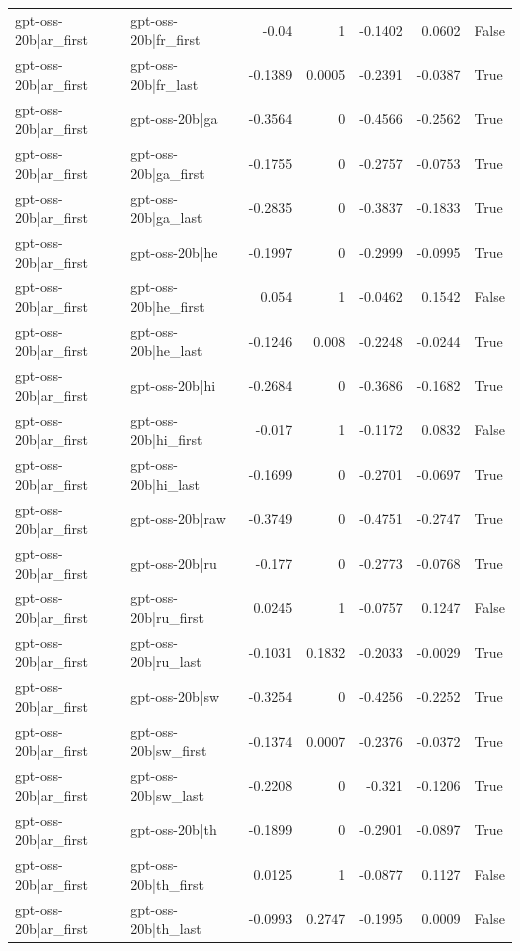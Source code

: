 \begin{table}
\begin{tabular}{l l r r r r l}
gpt-oss-20b|ar_first & gpt-oss-20b|fr_first & -0.04 & 1 & -0.1402 & 0.0602 & False \\
gpt-oss-20b|ar_first & gpt-oss-20b|fr_last & -0.1389 & 0.0005 & -0.2391 & -0.0387 & True \\
gpt-oss-20b|ar_first & gpt-oss-20b|ga & -0.3564 & 0 & -0.4566 & -0.2562 & True \\
gpt-oss-20b|ar_first & gpt-oss-20b|ga_first & -0.1755 & 0 & -0.2757 & -0.0753 & True \\
gpt-oss-20b|ar_first & gpt-oss-20b|ga_last & -0.2835 & 0 & -0.3837 & -0.1833 & True \\
gpt-oss-20b|ar_first & gpt-oss-20b|he & -0.1997 & 0 & -0.2999 & -0.0995 & True \\
gpt-oss-20b|ar_first & gpt-oss-20b|he_first & 0.054 & 1 & -0.0462 & 0.1542 & False \\
gpt-oss-20b|ar_first & gpt-oss-20b|he_last & -0.1246 & 0.008 & -0.2248 & -0.0244 & True \\
gpt-oss-20b|ar_first & gpt-oss-20b|hi & -0.2684 & 0 & -0.3686 & -0.1682 & True \\
gpt-oss-20b|ar_first & gpt-oss-20b|hi_first & -0.017 & 1 & -0.1172 & 0.0832 & False \\
gpt-oss-20b|ar_first & gpt-oss-20b|hi_last & -0.1699 & 0 & -0.2701 & -0.0697 & True \\
gpt-oss-20b|ar_first & gpt-oss-20b|raw & -0.3749 & 0 & -0.4751 & -0.2747 & True \\
gpt-oss-20b|ar_first & gpt-oss-20b|ru & -0.177 & 0 & -0.2773 & -0.0768 & True \\
gpt-oss-20b|ar_first & gpt-oss-20b|ru_first & 0.0245 & 1 & -0.0757 & 0.1247 & False \\
gpt-oss-20b|ar_first & gpt-oss-20b|ru_last & -0.1031 & 0.1832 & -0.2033 & -0.0029 & True \\
gpt-oss-20b|ar_first & gpt-oss-20b|sw & -0.3254 & 0 & -0.4256 & -0.2252 & True \\
gpt-oss-20b|ar_first & gpt-oss-20b|sw_first & -0.1374 & 0.0007 & -0.2376 & -0.0372 & True \\
gpt-oss-20b|ar_first & gpt-oss-20b|sw_last & -0.2208 & 0 & -0.321 & -0.1206 & True \\
gpt-oss-20b|ar_first & gpt-oss-20b|th & -0.1899 & 0 & -0.2901 & -0.0897 & True \\
gpt-oss-20b|ar_first & gpt-oss-20b|th_first & 0.0125 & 1 & -0.0877 & 0.1127 & False \\
gpt-oss-20b|ar_first & gpt-oss-20b|th_last & -0.0993 & 0.2747 & -0.1995 & 0.0009 & False \\

\end{tabular}
\end{table}
